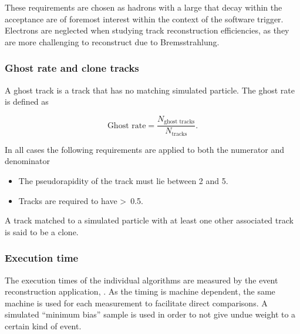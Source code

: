 \noindent These requirements are chosen as \bquark hadrons with a large \pt that decay within the \lhcb acceptance are of foremost interest within the context of the \lhcb software trigger. Electrons are neglected when studying track reconstruction efficiencies, as they are more challenging to reconstruct due to Bremsstrahlung.

\subsubsection{Ghost rate and clone tracks}
\label{sec:track:gr}
A ghost track is a track that has no matching simulated particle. The ghost rate is defined as

\begin{equation}
\text{Ghost rate}  = \frac{N_{\text{ghost~tracks}}}{N_{\text{tracks}}}.
\end{equation}

\noindent In all cases the following requirements are applied to both the numerator and denominator

\begin{itemize}
\item The pseudorapidity of the track must lie between 2 and 5.
\item Tracks are required to have \pt\textgreater~0.5\gevc.
\end{itemize}

A track matched to a simulated particle with at least one other associated track is said to be a clone.

\subsubsection{Execution time}
\label{sec:track:timing}

The execution times of the individual algorithms are measured by the \lhcb event reconstruction application, \brunel. As the timing is machine dependent, the same machine is used for each measurement to facilitate direct comparisons. A simulated ``minimum bias'' sample is used in order to not give undue weight to a certain kind of event.


